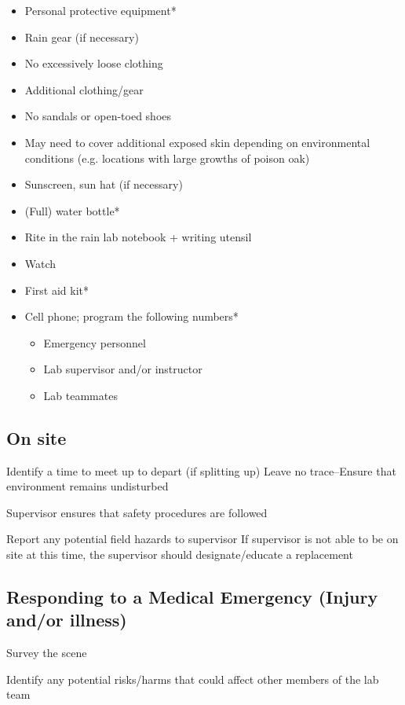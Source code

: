\documentclass[12pt]{../SOP4_alpha}\usepackage[]{graphicx}\usepackage[]{color}
\begin{document}
  \begin{itemize}
  \item Personal protective equipment*
  \item Rain gear (if necessary)
  \item No excessively loose clothing  
  \item Additional clothing/gear
  \item No sandals or open-toed shoes
  \item May need to cover additional exposed skin depending on environmental conditions (e.g. locations with large growths of poison oak)
  \item Sunscreen, sun hat (if necessary)
  
  \item (Full) water bottle*
  \item Rite in the rain lab notebook + writing utensil
  \item Watch
  \item First aid kit*
  \item Cell phone; program the following numbers*
\begin{itemize}
  \item Emergency personnel
  \item Lab supervisor and/or instructor
  \item Lab teammates
\end{itemize}
\end{itemize}

\subsection{On site}

\NP Identify a time to meet up to depart (if splitting up)
\NP Leave no trace--Ensure that environment remains undisturbed

\NP Supervisor ensures that safety procedures are followed

\NP Report any potential field hazards to supervisor
If supervisor is not able to be on site at this time, the supervisor should designate/educate a replacement

\subsection{Responding to a Medical Emergency (Injury and/or illness)}

\NP Survey the scene

\NP Identify any potential risks/harms that could affect other members of the lab team
\end{document}
